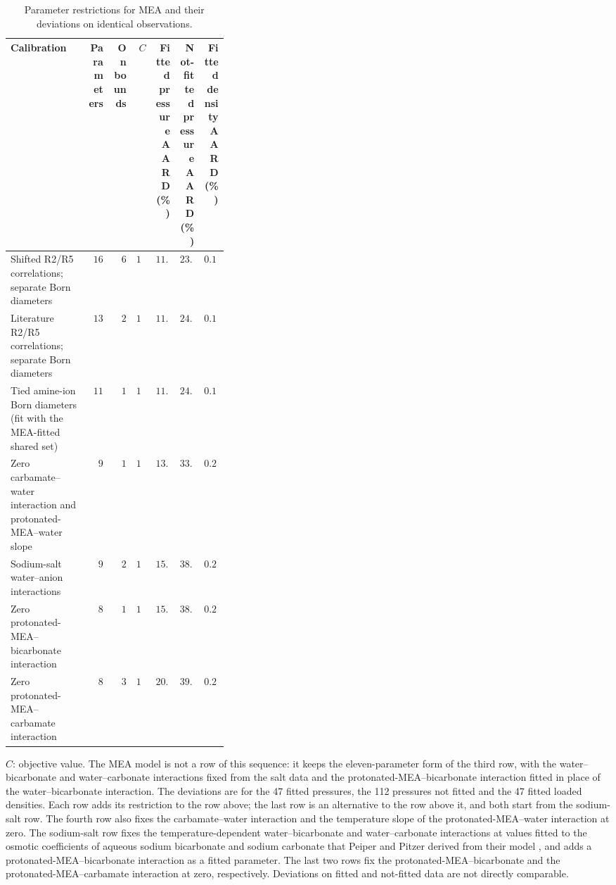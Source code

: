 \begin{table}[!htbp]\small\setlength{\tabcolsep}{3pt}\centering
\caption{Parameter restrictions for MEA and their deviations on identical observations.}\label{tab:choice-cost}
\begin{tabular}{@{}>{\raggedright\arraybackslash}p{0.3600\linewidth}rrrrrr@{}}
\toprule
Calibration & Parameters & On bounds & $C$ & \makecell[rb]{Fitted\\pressure\\AARD (\%)} & \makecell[rb]{Not-fitted\\pressure\\AARD (\%)} & \makecell[rb]{Fitted\\density\\AARD (\%)} \\
\midrule
Shifted R2/\allowbreak{}R5 correlations; separate Born diameters & $16$ & $6$ & $148.511$ & $11.79$ & $23.82$ & $0.16$ \\
Literature R2/\allowbreak{}R5 correlations; separate Born diameters & $13$ & $2$ & $150.532$ & $11.96$ & $24.18$ & $0.15$ \\
Tied amine-ion Born diameters (fit with the MEA-fitted shared set) & $11$ & $1$ & $150.763$ & $11.64$ & $24.89$ & $0.15$ \\
Zero carbamate--water interaction and protonated-MEA--water slope & $9$ & $1$ & $169.138$ & $13.98$ & $33.16$ & $0.20$ \\
Sodium-salt water--anion interactions & $9$ & $2$ & $174.451$ & $15.46$ & $38.48$ & $0.21$ \\
Zero protonated-MEA--bicarbonate interaction & $8$ & $1$ & $176.049$ & $15.59$ & $38.53$ & $0.21$ \\
Zero protonated-MEA--carbamate interaction & $8$ & $3$ & $186.615$ & $20.09$ & $39.70$ & $0.23$ \\
\bottomrule
\end{tabular}
\par\smallskip\parbox{\linewidth}{\footnotesize\raggedright $C$: objective value. The MEA model is not a row of this sequence: it keeps the eleven-parameter form of the third row, with the water--bicarbonate and water--carbonate interactions fixed from the salt data and the protonated-MEA--bicarbonate interaction fitted in place of the water--bicarbonate interaction. The deviations are for the 47 fitted pressures, the 112 pressures not fitted and the 47 fitted loaded densities. Each row adds its restriction to the row above; the last row is an alternative to the row above it, and both start from the sodium-salt row. The fourth row also fixes the carbamate--water interaction and the temperature slope of the protonated-MEA--water interaction at zero. The sodium-salt row fixes the temperature-dependent water--bicarbonate and water--carbonate interactions at values fitted to the osmotic coefficients of aqueous sodium bicarbonate and sodium carbonate that Peiper and Pitzer derived from their model \cite{peiperThermodynamicsAqueousCarbonate1982}, and adds a protonated-MEA--bicarbonate interaction as a fitted parameter. The last two rows fix the protonated-MEA--bicarbonate and the protonated-MEA--carbamate interaction at zero, respectively. Deviations on fitted and not-fitted data are not directly comparable.}
\end{table}
